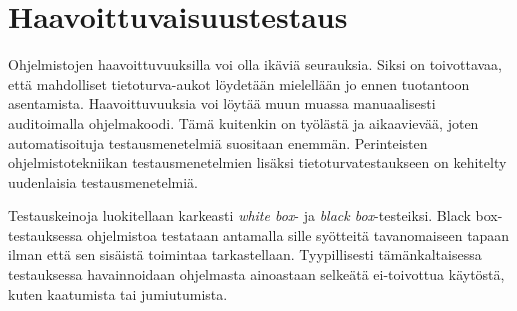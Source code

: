 \section{Haavoittuvaisuustestaus}

Ohjelmistojen haavoittuvuuksilla voi olla ikäviä seurauksia.
Siksi on toivottavaa, että mahdolliset tietoturva-aukot löydetään mielellään jo ennen tuotantoon asentamista.
Haavoittuvuuksia voi löytää muun muassa manuaalisesti auditoimalla ohjelmakoodi.
Tämä kuitenkin on työlästä ja aikaavievää, joten automatisoituja testausmenetelmiä suositaan enemmän.
Perinteisten ohjelmistotekniikan testausmenetelmien lisäksi tietoturvatestaukseen on kehitelty uudenlaisia testausmenetelmiä.


Testauskeinoja luokitellaan karkeasti \emph{white box}- ja \emph{black box}-testeiksi.
Black box-testauksessa ohjelmistoa testataan antamalla sille syötteitä tavanomaiseen tapaan ilman että sen sisäistä toimintaa tarkastellaan.
Tyypillisesti tämänkaltaisessa testauksessa havainnoidaan ohjelmasta ainoastaan selkeätä ei-toivottua käytöstä, kuten kaatumista tai jumiutumista.
